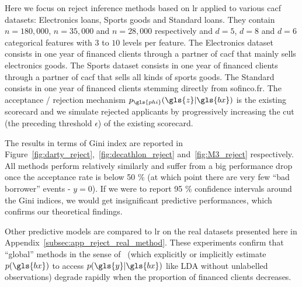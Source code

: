 Here we focus on reject inference methods based on \gls{lr} applied to various \gls{cacf} datasets: Electronics loans, Sports goods and Standard loans. They contain $n=180{,}000$, $n=35{,}000$ and $n=28{,}000$ respectively and $d=5$, $d=8$ and $d=6$ categorical features with $3$ to $10$ levels per feature. The Electronics dataset consists in one year of financed clients through a partner of \gls{cacf} that mainly sells electronics goods. The Sports dataset consists in one year of financed clients through a partner of \gls{cacf} that sells all kinds of sports goods. The Standard consists in one year of financed clients stemming directly from sofinco.fr. The acceptance / rejection mechanism $p_{\gls{phi}}(\gls{z} | \gls{bx})$ is the existing scorecard and we simulate rejected applicants by progressively increasing the \gls{cut} (the preceding threshold $\epsilon$) of the existing scorecard.

The results in terms of Gini index are reported in Figure~\ref{fig:darty_reject},~\ref{fig:decathlon_reject} and~\ref{fig:M3_reject} respectively. All methods perform relatively similarly and suffer from a big performance drop once the acceptance rate is below 50 \% (at which point there are very few ``bad borrower'' events - $y = 0$). If we were to report 95 \% confidence intervals around the Gini indices, we would get insignificant predictive performances, which confirms our theoretical findings.

Other predictive models are compared to \gls{lr} on the real datasets presented here in Appendix~\ref{subsec:app_reject_real_method}. These experiments confirm that ``global'' methods in the sense of~\cite{zadrozny2004learning} (which explicitly or implicitly estimate $p(\gls{bx})$ to access $p(\gls{y} | \gls{bx})$ like LDA without unlabelled observations) degrade rapidly when the proportion of financed clients decreases.


